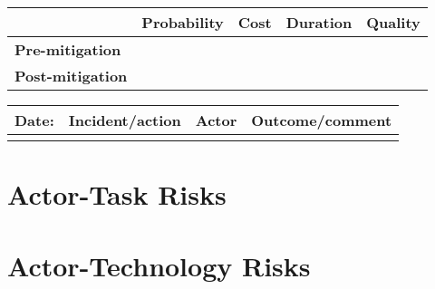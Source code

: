 \begin{table}
\begin{tabularx}{\textwidth}{| l | l | X | X | X |}
		\hline
		 &  \textbf{Probability} & \textbf{Cost} & \textbf{Duration} & \textbf{Quality} \\ \hline
		\textbf{Pre-mitigation} &  &  &  &  \\ \hline
		\textbf{Post-mitigation} &  &  &  &  \\ \hline \hline
	\end{tabularx}
	\begin{tabularx}{\textwidth}{| l | X | l | X |}
		\hline
		\textbf{Date:} & \textbf{Incident/action} & \textbf{Actor} & \textbf{Outcome/comment} \\ \hline
		 &  &  &  \\ \hline
	\end{tabularx}%
\end{table}

\FloatBarrier

\section{Actor-Task Risks}
\label{Actor-Task_Risks}

\FloatBarrier

\FloatBarrier

\section{Actor-Technology Risks}
\label{Actor-Technology_Risks}

\FloatBarrier

